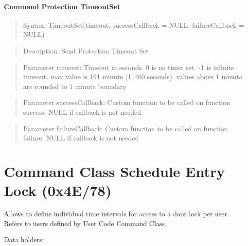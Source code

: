 \paragraph{Command Protection TimeoutSet}
\begin{quote}Syntax: TimeoutSet(timeout, successCallback = NULL, failureCallback = NULL)\end{quote}
\begin{quote}Description: Send Protection Timeout Set\end{quote}
\begin{quote}Parameter timeout: Timeout in seconds. 0 is no timer set. -1 is infinite timeout. max value is 191 minute (11460 seconds). values above 1 minute are rounded to 1 minute boundary\end{quote}
\begin{quote}Parameter successCallback: Custom function to be called on function success. NULL if callback is not needed\end{quote}
\begin{quote}Parameter failureCallback: Custom function to be called on function failure. NULL if callback is not needed\end{quote}



\section{Command Class Schedule Entry Lock (0x4E/78)}

Allows to define individual time intervals for access to a door lock per user. Refers to users defined by User Code Command Class.
\newline

\noindent
Data holders:

